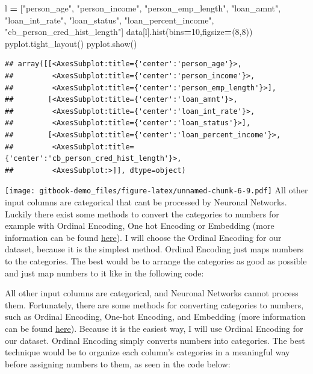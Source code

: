 \documentclass[
]{book}
\newenvironment{Shaded}{\begin{snugshade}}{\end{snugshade}}
\newcommand{\DecValTok}[1]{\textcolor[rgb]{0.00,0.00,0.81}{#1}}
\newcommand{\NormalTok}[1]{#1}
\newcommand{\OperatorTok}[1]{\textcolor[rgb]{0.81,0.36,0.00}{\textbf{#1}}}
\newcommand{\StringTok}[1]{\textcolor[rgb]{0.31,0.60,0.02}{#1}}
\begin{document}
\begin{Shaded}
\begin{Highlighting}[]
\NormalTok{l }\OperatorTok{=}\NormalTok{ [}\StringTok{"person\_age"}\NormalTok{, }\StringTok{"person\_income"}\NormalTok{, }\StringTok{"person\_emp\_length"}\NormalTok{, }\StringTok{"loan\_amnt"}\NormalTok{, }\StringTok{"loan\_int\_rate"}\NormalTok{, }\StringTok{"loan\_status"}\NormalTok{, }\StringTok{"loan\_percent\_income"}\NormalTok{, }\StringTok{"cb\_person\_cred\_hist\_length"}\NormalTok{]}
\NormalTok{data[l].hist(bins}\OperatorTok{=}\DecValTok{10}\NormalTok{,figsize}\OperatorTok{=}\NormalTok{(}\DecValTok{8}\NormalTok{,}\DecValTok{8}\NormalTok{))}
\NormalTok{pyplot.tight\_layout()}
\NormalTok{pyplot.show()}
\end{Highlighting}
\end{Shaded}

\begin{verbatim}
## array([[<AxesSubplot:title={'center':'person_age'}>,
##         <AxesSubplot:title={'center':'person_income'}>,
##         <AxesSubplot:title={'center':'person_emp_length'}>],
##        [<AxesSubplot:title={'center':'loan_amnt'}>,
##         <AxesSubplot:title={'center':'loan_int_rate'}>,
##         <AxesSubplot:title={'center':'loan_status'}>],
##        [<AxesSubplot:title={'center':'loan_percent_income'}>,
##         <AxesSubplot:title={'center':'cb_person_cred_hist_length'}>,
##         <AxesSubplot:>]], dtype=object)
\end{verbatim}

\texttt{[image: gitbook-demo\_files/figure-latex/unnamed-chunk-6-9.pdf]}
All other input columns are categorical that cant be processed by Neuronal Networks. Luckily there exist some methods to convert the categories to numbers for example with Ordinal Encoding, One hot Encoding or Embedding (more information can be found \href{https://machinelearningmastery.com/how-to-prepare-categorical-data-for-deep-learning-in-python/}{here}). I will choose the Ordinal Encoding for our dataset, because it is the simplest method. Ordinal Encoding just maps numbers to the categories. The best would be to arrange the categories as good as possible and just map numbers to it like in the following code:

All other input columns are categorical, and Neuronal Networks cannot process them. Fortunately, there are some methods for converting categories to numbers, such as Ordinal Encoding, One-hot Encoding, and Embedding (more information can be found \href{https://machinelearningmastery.com/how-to-prepare-categorical-data-for-deep-learning-in-python/}{here}). Because it is the easiest way, I will use Ordinal Encoding for our dataset. Ordinal Encoding simply converts numbers into categories. The best technique would be to organize each column's categories in a meaningful way before assigning numbers to them, as seen in the code below:
\end{document}
